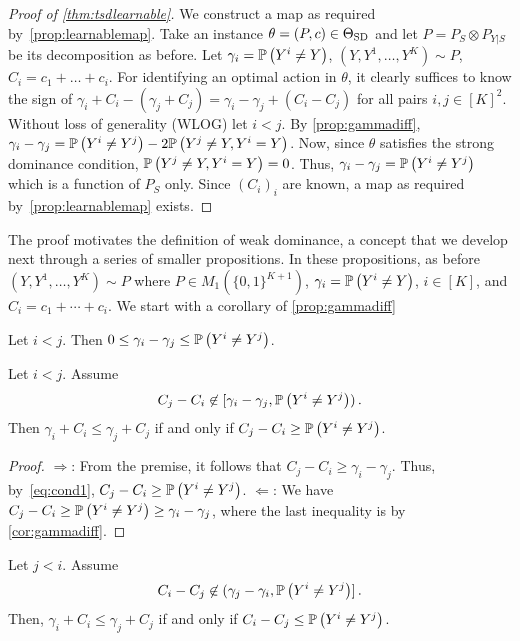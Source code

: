 \begin{proof}[Proof of \cref{thm:tsdlearnable}]
We construct a map as required by~\cref{prop:learnablemap}.
Take an instance $\theta = (P,c)\in \Theta_{\mathrm{SD}}$ and let $P = P_S \otimes P_{Y|S}$ be its decomposition as before.
Let $\gamma_i = \mathbb{P}\left(Y^i \ne Y\right)$, $(Y,Y^1,\dots,Y^K)\sim P$, $C_i = c_1+\dots+c_i$.
For identifying an optimal action in $\theta$, it clearly suffices
to know the sign of $\gamma_i + C_i - (\gamma_j +C_j) = \gamma_i-\gamma_j + (C_i-C_j)$ for all pairs $i,j\in [K]^2$.
Without loss of generality (WLOG) let $i<j$. By \cref{prop:gammadiff},
$\gamma_i - \gamma_j = \mathbb{P}\left( Y^i \ne Y^j \right) -2 \mathbb{P}\left( Y^j\ne Y, Y^i = Y \right)$.
Now, since $\theta$ satisfies the strong dominance condition, $ \mathbb{P}\left( Y^j\ne Y, Y^i = Y \right) = 0$.
Thus, $\gamma_i - \gamma_j = \mathbb{P}\left( Y^i \ne Y^j \right)$
which is a function of $P_S$ only.
Since $(C_i)_i$ are known, a map as required by~\cref{prop:learnablemap} exists.
\end{proof}
The proof motivates the definition of weak dominance, a concept that we develop next through a series of smaller
propositions. In these propositions, as before $(Y,Y^1,\dots,Y^K) \sim P$ where $P\in M_1(\{0,1\}^{K+1})$,
 $\gamma_i = \mathbb{P}\left(Y^i \ne Y\right)$, $i\in [K]$, and $C_i = c_1 + \cdots + c_i$.
We start with a corollary of \cref{prop:gammadiff}
\begin{cor}
\label{cor:gammadiff}
Let $i<j$. Then $0\le \gamma_i -\gamma_j \le \mathbb{P}\left(Y^i\ne Y^j\right)$.
\end{cor}
\begin{prop}
\label{prop:ilej}
Let $i<j$. Assume 
\begin{align}
\label{eq:cond1}
C_j - C_i \not\in [\gamma_i - \gamma_j, \mathbb{P}\left(Y^i\ne Y^j\right) )\,.
\end{align}
Then $\gamma_i + C_i \le \gamma_j + C_j$ if and only if $C_j - C_i \ge \mathbb{P}\left(Y^i\ne Y^j\right)$.
\end{prop}
\begin{proof}
\noindent $\Rightarrow$: From the premise, it follows that $C_j - C_i \ge \gamma_i - \gamma_j$.
Thus, by~\eqref{eq:cond1}, $C_j - C_i \ge \mathbb{P}\left(Y^i\ne Y^j\right)$.
\noindent $\Leftarrow$: We have $C_j - C_i \ge \mathbb{P}\left(Y^i \ne Y^j\right) \ge \gamma_i -\gamma_j$, where the last
inequality is by \cref{cor:gammadiff}.
\end{proof}
\begin{prop}
\label{prop:jlei}
Let $j<i$. Assume
\begin{align}
\label{eq:cond2}
C_i - C_j \not\in (\gamma_j - \gamma_i, \mathbb{P}\left(Y^i \ne Y^j\right) ]\,.
\end{align}
Then, $\gamma_i + C_i \le \gamma_j + C_j$ if and only if $C_i - C_j \le \mathbb{P}\left(Y^i \ne Y^j\right)$.
\end{prop}
